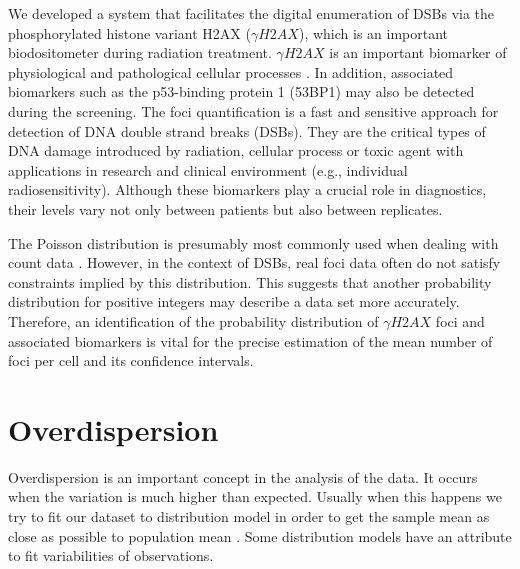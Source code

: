 We developed a system that facilitates the digital  enumeration of DSBs via the phosphorylated histone variant H2AX ($\gamma H2AX$), which is an important  biodositometer during radiation treatment. $\gamma H2AX$ is an important biomarker of physiological and pathological cellular processes \citep{reddig_dna_2018,rodiger_quantification_2018}. In addition, associated biomarkers such as the p53-binding protein 1 (53BP1) may also be detected during the screening. The foci quantification is a fast and sensitive approach for detection of DNA double strand breaks (DSBs).
They are the critical types of DNA damage introduced by radiation, cellular process or toxic agent with applications in research and clinical environment (e.g., individual radiosensitivity). Although these biomarkers play a crucial role in diagnostics, their levels vary not only between patients but also between replicates.

The Poisson distribution is presumably most commonly used when dealing with count data \citep{morina_generalized_2015}. However, in the context of DSBs, real foci data often do not satisfy constraints implied by this distribution. This suggests that another probability distribution for positive integers may describe a data set more accurately. Therefore, an identification of the probability distribution of $\gamma H2AX$ foci and associated biomarkers is vital for the precise estimation of the mean number of foci per cell and its confidence intervals.


\section{Overdispersion}

Overdispersion is an important concept in the analysis of the data. It occurs when the variation is much higher than expected. Usually when this happens we try to fit our dataset to distribution model in order to get the sample mean as close as possible to population mean \citep{morina_generalized_2015}. Some distribution models have an attribute to fit variabilities of observations.


